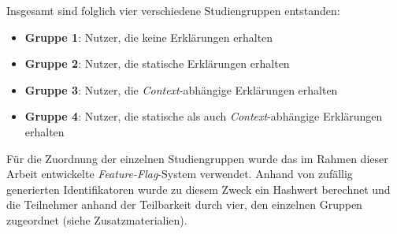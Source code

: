 Insgesamt sind folglich vier verschiedene Studiengruppen entstanden:

\begin{itemize}
    \item \textbf{Gruppe 1}: Nutzer, die keine Erklärungen erhalten
    \item \textbf{Gruppe 2}: Nutzer, die statische Erklärungen erhalten
    \item \textbf{Gruppe 3}: Nutzer, die \textit{Context}-abhängige Erklärungen erhalten
    \item \textbf{Gruppe 4}: Nutzer, die statische als auch \textit{Context}-abhängige Erklärungen erhalten
\end{itemize}

Für die Zuordnung der einzelnen Studiengruppen wurde das im Rahmen dieser Arbeit entwickelte \textit{Feature-Flag}-System verwendet. Anhand von zufällig generierten Identifikatoren wurde zu diesem Zweck ein Hashwert berechnet und die Teilnehmer anhand der Teilbarkeit durch vier, den einzelnen Gruppen zugeordnet (siehe Zusatzmaterialien).

\newpage